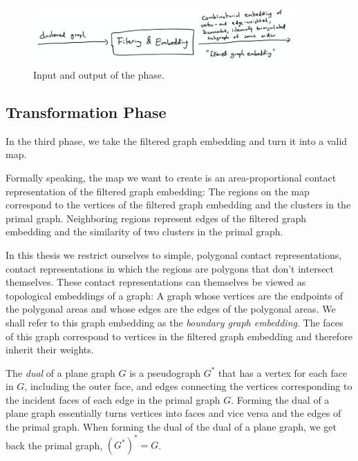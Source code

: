 \begin{figure}[H]
	\centering\includegraphics[width=0.9\textwidth]{Resources/Pipeline-Filtering-and-Embedding.png}
	\caption{Input and output of the  phase.}
	\label{fig:pipeline-static}
\end{figure}


\subsection{Transformation Phase}

In the third phase, we take the filtered graph embedding and turn it into a valid map.

Formally speaking, the map we want to create is an area-proportional contact representation of the filtered graph embedding: The regions on the map correspond to the vertices of the filtered graph embedding and the clusters in the primal graph. Neighboring regions represent edges of the filtered graph embedding and the similarity of two clusters in the primal graph.

In this thesis we restrict ourselves to simple, polygonal contact representations, \ie{} contact representations in which the regions are polygons that don't intersect themselves. These contact representations can themselves be viewed as topological embeddings of a graph: A graph whose vertices are the endpoints of the polygonal areas and whose edges are the edges of the polygonal areas. We shall refer to this graph embedding as the \emph{boundary graph embedding}. The faces of this graph correspond to vertices in the filtered graph embedding and therefore inherit their weights.

The \emph{dual} of a plane graph $G$ is a pseudograph $G^*$ that has a vertex for each face in $G$, including the outer face, and edges connecting the vertices corresponding to the incident faces of each edge in the primal graph $G$. Forming the dual of a plane graph essentially turns vertices into faces and vice versa and  the edges of the primal graph. When forming the dual of the dual of a plane graph, we get back the primal graph, \ie{} $(G^*)^* = G$.

